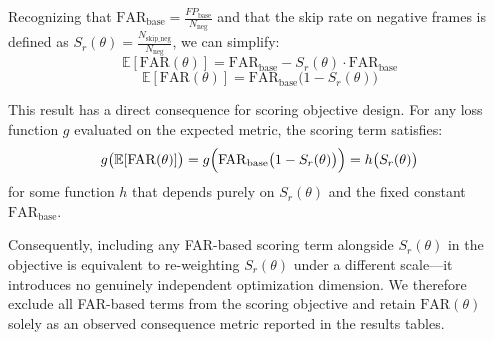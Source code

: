 Recognizing that $\mathrm{FAR}_{\text{base}} = \frac{FP_{\text{base}}}{N_{\text{neg}}}$ and that the skip rate on negative frames is defined as $S_r(\theta) = \frac{N_{\text{skip\_neg}}}{N_{\text{neg}}}$, we can simplify:
\[ \mathbb{E}[\mathrm{FAR}(\theta)] = \mathrm{FAR}_{\text{base}} - S_r(\theta) \cdot \mathrm{FAR}_{\text{base}} \]
\[ \mathbb{E}[\mathrm{FAR}(\theta)] = \mathrm{FAR}_{\text{base}} \bigl(1 - S_r(\theta)\bigr) \]

This result has a direct consequence for scoring objective design. For any loss function $g$ evaluated on the expected metric, the scoring term satisfies:
\[ g\bigl(\mathbb{E}[\mathrm{FAR}(\theta)]\bigr) = g\Bigl(\mathrm{FAR}_{\text{base}} \bigl(1 - S_r(\theta)\bigr)\Bigr) = h\bigl(S_r(\theta)\bigr) \]
for some function $h$ that depends purely on $S_r(\theta)$ and the fixed constant $\mathrm{FAR}_{\text{base}}$. 

Consequently, including any FAR-based scoring term alongside $S_r(\theta)$ in the objective is equivalent to re-weighting $S_r(\theta)$ under a different scale---it introduces no genuinely independent optimization dimension. We therefore exclude all FAR-based terms from the scoring objective and retain $\mathrm{FAR}(\theta)$ solely as an observed consequence metric reported in the results tables.